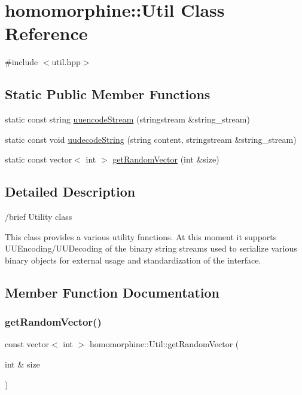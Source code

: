 \hypertarget{classhomomorphine_1_1_util}{}\section{homomorphine\+::Util Class Reference}
\label{classhomomorphine_1_1_util}


{\ttfamily \#include $<$util.\+hpp$>$}

\subsection*{Static Public Member Functions}
\begin{DoxyCompactItemize}
\item 
static const string \mbox{\hyperlink{classhomomorphine_1_1_util_a26f29995aa48f4374993ec4afeca2ac8}{uuencode\+Stream}} (stringstream \&string\+\_\+stream)
\item 
static const void \mbox{\hyperlink{classhomomorphine_1_1_util_aba5af6d7356aca8c70ae4fb1e5d36b70}{uudecode\+String}} (string content, stringstream \&string\+\_\+stream)
\item 
static const vector$<$ int $>$ \mbox{\hyperlink{classhomomorphine_1_1_util_a2dcf1d83028f3d47ba49b80696fefef7}{get\+Random\+Vector}} (int \&size)
\end{DoxyCompactItemize}


\subsection{Detailed Description}
/brief Utility class

This class provides a various utility functions. At this moment it supports U\+U\+Encoding/\+U\+U\+Decoding of the binary string streams used to serialize various binary objects for external usage and standardization of the interface. 

\subsection{Member Function Documentation}
\mbox{\label{classhomomorphine_1_1_util_a2dcf1d83028f3d47ba49b80696fefef7}} 
\subsubsection{\texorpdfstring{getRandomVector()}{getRandomVector()}}
{\footnotesize\ttfamily const vector$<$ int $>$ homomorphine\+::\+Util\+::get\+Random\+Vector (\begin{DoxyParamCaption}\item[{int \&}]{size }\end{DoxyParamCaption})\hspace{0.3cm}{\ttfamily [static]}}

